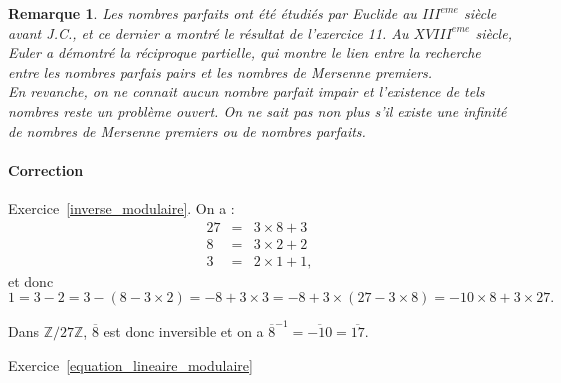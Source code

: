 \documentclass[11pt,a4paper]{article}
\newtheorem*{rem}{Remarque}
\newcommand{\Z}{\mathbb{Z}}
\begin{document}
\begin{rem}
Les nombres parfaits ont été étudiés par Euclide au $III^{eme}$ siècle avant J.C., et ce dernier a montré le résultat de l'exercice 11. Au $XVIII^{eme}$ siècle, Euler a démontré la réciproque partielle, qui montre le lien entre la recherche entre les nombres parfais pairs et les nombres de Mersenne premiers. \\
En revanche, on ne connait aucun nombre parfait impair et l'existence de tels nombres reste un problème ouvert. On ne sait pas non plus s'il existe une infinité de nombres de Mersenne premiers ou de nombres parfaits. 
\end{rem}


\begin{comment}
\paragraph{Correction exercice 8 TD 1}


(1) Soit $d=(2n+1)\wedge n^2+n$. Alors $d$ divise $2(n^2+n)-n(2n+1)=n$, donc $d | (2n+1)\wedge n=1$, donc $d=1$.

(2) Soit $d=(15n^2+8n+6)\wedge (30 n^2+21n+13)$. Alors $d$ divise  $30 n^2+21n+13-2.(15 n^2+8n+6)=5n+1$ donc $d$ divise $(15 n^2+8n+6)\wedge 5n+1$ donc $d$ divise $15 n^2+8n+6-3n(5n+1)=15 n^2+8n+6-15n^2-3n=5n+6$ donc $d$ divise $(5n+6)\wedge(5n+1)$ donc $d$ divise $5=(5n+6)-(5n+1)$.

Supposons que $5$ divise $15n^2+8n+6$ et $30 n^2+21n+13$. Alors $5$ divise $8n+6$ donc $3n+1=8n+6-5(n+1)$ et  $n+3=30n^2+21+13-5(6n^2+4n+2)$. Ainsi, $5$ divise $3n+1-3(n+3)=-8$ : c'est absurde donc $d=1$. 
\end{comment}


\paragraph{Correction}

Exercice~\ref{inverse_modulaire}. On a  :\[\begin{aligned} 27&=&3\times 8+3\\ 8&=&3\times 2+2\\ 3&=&2\times 1+1,\end{aligned}\] et donc \[1=3-2=3-(8-3\times 2)=-8+3\times 3=-8+3\times (27-3\times 8)=-10\times 8+3\times 27.\]

Dans $\Z/27\Z$, $\overline{8}$ est donc inversible et on a  $\overline{8}^{-1}=\overline{-10}=\overline{17}$.

Exercice~\ref{equation_lineaire_modulaire}
\end{document}
